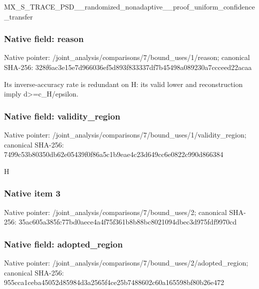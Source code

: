 \documentclass[10pt,a4paper]{article}
\begin{document}
\begingroup\raggedright\sloppy MX\_\allowbreak{}S\_\allowbreak{}TRACE\_\allowbreak{}PSD\_\allowbreak{}\_\allowbreak{}randomized\_\allowbreak{}nonadaptive\_\allowbreak{}\_\allowbreak{}proof\_\allowbreak{}uniform\_\allowbreak{}confidence\_\allowbreak{}transfer\par\endgroup

\subsubsection{Native field: reason}
Native pointer: /joint\_\allowbreak{}analysis/comparisons/7/bound\_\allowbreak{}uses/1/reason; canonical SHA-256: 328f6ac3e15e7d966036ef5d893f833337df7b45498a089230a7ccceed22acaa

\begingroup\raggedright\sloppy Its inverse-accuracy rate is redundant on H:\allowbreak{} its valid lower and reconstruction imply d>=\allowbreak{}c\_\allowbreak{}H/\allowbreak{}epsilon.\par\endgroup

\subsubsection{Native field: validity\_\allowbreak{}region}
Native pointer: /joint\_\allowbreak{}analysis/comparisons/7/bound\_\allowbreak{}uses/1/validity\_\allowbreak{}region; canonical SHA-256: 7499c53b80350db62e05439f0f86a5c1b9eae4c23d649cc6e0822c990d866384

\begingroup\raggedright\sloppy H\par\endgroup

\subsubsection{Native item 3}
Native pointer: /joint\_\allowbreak{}analysis/comparisons/7/bound\_\allowbreak{}uses/2; canonical SHA-256: 35ac605a385fc77bd0aece4a4f75f361b8b88bc8021094dbec3d975fdf9970cd

\subsubsection{Native field: adopted\_\allowbreak{}region}
Native pointer: /joint\_\allowbreak{}analysis/comparisons/7/bound\_\allowbreak{}uses/2/adopted\_\allowbreak{}region; canonical SHA-256: 955cca1ceba45052d85984d3a2565f4ce25b7488602c60a165598bf80b26e472
\end{document}
